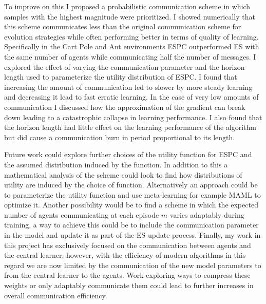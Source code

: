 To improve on this I proposed a probabilistic communication scheme in which samples with the highest magnitude were prioritized. I showed numerically that this scheme communicates less than the original communication scheme for evolution strategies while often performing better in terms of quality of learning. Specifically in the Cart Pole and Ant environments ESPC outperformed ES with the same number of agents while communicating half the number of messages.
I explored the effect of varying the communication parameter and the horizon length used to parameterize the utility distribution of ESPC. I found that increasing the amount of communication led to slower by more steady learning and decreasing it lead to fast erratic learning. In the case of very low amounts of communication I discussed how the approximation of the gradient can break down leading to a catastrophic collapse in learning performance. I also found that the horizon length had little effect on the learning performance of the algorithm but did cause a communication burn in period proportional to its length.

Future work could explore further choices of the utility function for ESPC and the assumed distribution induced by the function. In addition to this a mathematical analysis of the scheme could look to find how distributions of utility are induced by the choice of function. Alternatively an approach could be to parameterize the utility function and use meta-learning for example MAML \cite{MAML} to optimize it. Another possibility would be to find a scheme in which the expected number of agents communicating at each episode $m$ varies adaptably during training, a way to achieve this could be to include the communication parameter in the model and update it as part of the ES update process. Finally, my work in this project has exclusively focused on the communication between agents and the central learner, however, with the efficiency of modern algorithms in this regard we are now limited by the communication of the new model parameters to from the central learner to the agents. Work exploring ways to compress these weights or only adaptably communicate them could lead to further increases in overall communication efficiency.